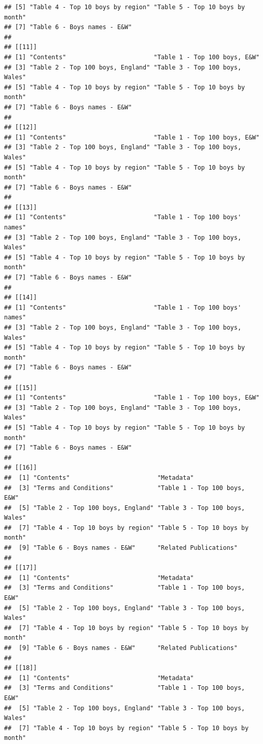 \documentclass[
]{book}
\begin{document}
\begin{verbatim}
## [5] "Table 4 - Top 10 boys by region" "Table 5 - Top 10 boys by month" 
## [7] "Table 6 - Boys names - E&W"     
## 
## [[11]]
## [1] "Contents"                        "Table 1 - Top 100 boys, E&W"    
## [3] "Table 2 - Top 100 boys, England" "Table 3 - Top 100 boys, Wales"  
## [5] "Table 4 - Top 10 boys by region" "Table 5 - Top 10 boys by month" 
## [7] "Table 6 - Boys names - E&W"     
## 
## [[12]]
## [1] "Contents"                        "Table 1 - Top 100 boys, E&W"    
## [3] "Table 2 - Top 100 boys, England" "Table 3 - Top 100 boys, Wales"  
## [5] "Table 4 - Top 10 boys by region" "Table 5 - Top 10 boys by month" 
## [7] "Table 6 - Boys names - E&W"     
## 
## [[13]]
## [1] "Contents"                        "Table 1 - Top 100 boys' names"  
## [3] "Table 2 - Top 100 boys, England" "Table 3 - Top 100 boys, Wales"  
## [5] "Table 4 - Top 10 boys by region" "Table 5 - Top 10 boys by month" 
## [7] "Table 6 - Boys names - E&W"     
## 
## [[14]]
## [1] "Contents"                        "Table 1 - Top 100 boys' names"  
## [3] "Table 2 - Top 100 boys, England" "Table 3 - Top 100 boys, Wales"  
## [5] "Table 4 - Top 10 boys by region" "Table 5 - Top 10 boys by month" 
## [7] "Table 6 - Boys names - E&W"     
## 
## [[15]]
## [1] "Contents"                        "Table 1 - Top 100 boys, E&W"    
## [3] "Table 2 - Top 100 boys, England" "Table 3 - Top 100 boys, Wales"  
## [5] "Table 4 - Top 10 boys by region" "Table 5 - Top 10 boys by month" 
## [7] "Table 6 - Boys names - E&W"     
## 
## [[16]]
##  [1] "Contents"                        "Metadata"                       
##  [3] "Terms and Conditions"            "Table 1 - Top 100 boys, E&W"    
##  [5] "Table 2 - Top 100 boys, England" "Table 3 - Top 100 boys, Wales"  
##  [7] "Table 4 - Top 10 boys by region" "Table 5 - Top 10 boys by month" 
##  [9] "Table 6 - Boys names - E&W"      "Related Publications"           
## 
## [[17]]
##  [1] "Contents"                        "Metadata"                       
##  [3] "Terms and Conditions"            "Table 1 - Top 100 boys, E&W"    
##  [5] "Table 2 - Top 100 boys, England" "Table 3 - Top 100 boys, Wales"  
##  [7] "Table 4 - Top 10 boys by region" "Table 5 - Top 10 boys by month" 
##  [9] "Table 6 - Boys names - E&W"      "Related Publications"           
## 
## [[18]]
##  [1] "Contents"                        "Metadata"                       
##  [3] "Terms and Conditions"            "Table 1 - Top 100 boys, E&W"    
##  [5] "Table 2 - Top 100 boys, England" "Table 3 - Top 100 boys, Wales"  
##  [7] "Table 4 - Top 10 boys by region" "Table 5 - Top 10 boys by month" 

\end{verbatim}
\end{document}

